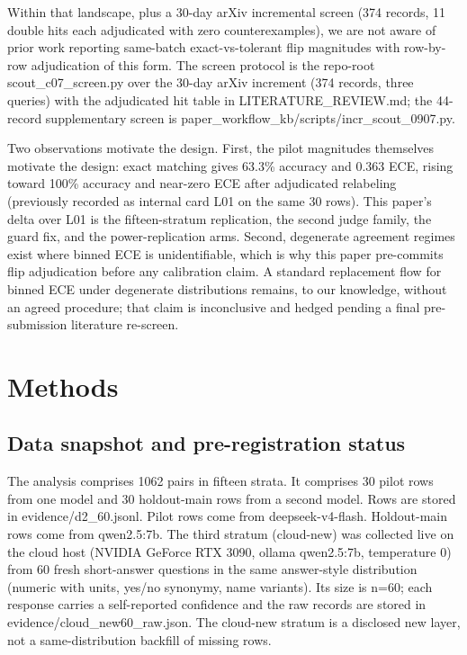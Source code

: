 \documentclass[10pt]{article} %
\begin{document}
Within that landscape, plus a 30-day arXiv incremental screen (374 records, 11 double hits each adjudicated with zero counterexamples), we are not aware of prior work reporting same-batch exact-vs-tolerant flip magnitudes with row-by-row adjudication of this form. The screen protocol is the repo-root scout\_c07\_screen.py over the 30-day arXiv increment (374 records, three queries) with the adjudicated hit table in LITERATURE\_REVIEW.md; the 44-record supplementary screen is paper\_workflow\_kb/scripts/incr\_scout\_0907.py.

Two observations motivate the design. First, the pilot magnitudes themselves motivate the design: exact matching gives 63.3\% accuracy and 0.363 ECE, rising toward 100\% accuracy and near-zero ECE after adjudicated relabeling (previously recorded as internal card L01 on the same 30 rows). This paper's delta over L01 is the fifteen-stratum replication, the second judge family, the guard fix, and the power-replication arms. Second, degenerate agreement regimes exist where binned ECE is unidentifiable, which is why this paper pre-commits flip adjudication before any calibration claim. A standard replacement flow for binned ECE under degenerate distributions remains, to our knowledge, without an agreed procedure; that claim is inconclusive and hedged pending a final pre-submission literature re-screen.

\section{Methods}
\label{sec:methods}

\subsection{Data snapshot and pre-registration status}

The analysis comprises 1062 pairs in fifteen strata.
It comprises 30 pilot rows from one model and 30 holdout-main rows from a second model.
Rows are stored in evidence/d2\_60.jsonl.
Pilot rows come from deepseek-v4-flash.
Holdout-main rows come from qwen2.5:7b.
The third stratum (cloud-new) was collected live on the cloud host (NVIDIA GeForce RTX 3090, ollama qwen2.5:7b, temperature 0) from 60 fresh short-answer questions in the same answer-style distribution (numeric with units, yes/no synonymy, name variants).
Its size is n=60; each response carries a self-reported confidence and the raw records are stored in evidence/cloud\_new60\_raw.json.
The cloud-new stratum is a disclosed new layer, not a same-distribution backfill of missing rows.
\end{document}
